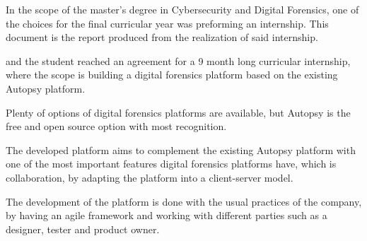 In the scope of the master's degree in Cybersecurity and Digital Forensics, one of the choices for the final curricular year was preforming an internship. 
This document is the report produced from the realization of said internship.

\company \space and the student reached an agreement for a 9 month long curricular internship, where the scope is building a digital forensics platform based on the existing Autopsy platform.

Plenty of options of digital forensics platforms are available, but Autopsy is the free and open source option with most recognition.

The developed platform aims to complement the existing Autopsy platform with one of the most important features digital forensics platforms have, 
which is collaboration, by adapting the platform into a client-server model.

The development of the platform is done with the usual practices of the company, by having an agile framework and working with different parties such as a designer, tester and product owner.

\bigskip


\endgroup           
